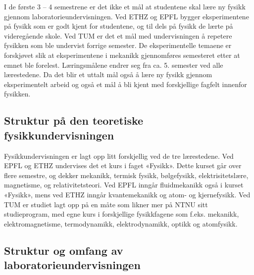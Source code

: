 \documentclass{article}
\begin{document}
I de første 3 – 4 semestrene er det ikke et mål at studentene skal lære ny fysikk gjennom laboratorieundervisningen. Ved ETHZ og EPFL bygger eksperimentene på fysikk som er godt kjent for studentene, og til dels på fysikk de lærte på videregående skole. Ved TUM er det et mål med undervisningen å repetere fysikken som ble undervist forrige semester. De eksperimentelle temaene er forskjøvet slik at eksperimentene i mekanikk gjennomføres semesteret etter at emnet ble forelest. 
Læringsmålene endrer seg fra ca. 5. semester ved alle lærestedene. Da det blir et uttalt mål også å lære ny fysikk gjennom eksperimentelt arbeid og også et mål å bli kjent med forskjellige fagfelt innenfor fysikken. 

\subsection{Struktur på den teoretiske fysikkundervisningen}
Fysikkundervisningen er lagt opp litt forskjellig ved de tre lærestedene. Ved EPFL og ETHZ undervises det et kurs i faget «Fysikk». Dette kurset går over flere semestre, og dekker mekanikk, termisk fysikk, bølgefysikk, elektrisitetslære, magnetisme, og relativitetsteori. Ved EPFL inngår fluidmekanikk også i kurset «Fysikk», mens ved ETHZ inngår kvantemekanikk og atom- og kjernefysikk. Ved TUM er studiet lagt opp på en måte som likner mer på NTNU sitt studieprogram, med egne kurs i forskjellige fysikkfagene som f.eks. mekanikk, elektromagnetisme, termodynamikk, elektrodynamikk, optikk og atomfysikk. 

\subsection{Struktur og omfang av laboratorieundervisningen}
\end{document}
